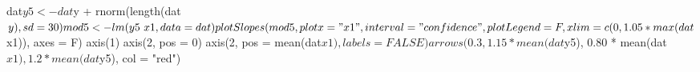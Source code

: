 \begin{Schunk}
\begin{Sinput}
 dat$y5 <- dat$y + rnorm(length(dat$y), sd = 30)
 mod5 <- lm(y5 ~ x1, data = dat)
 plotSlopes(mod5, plotx = "x1", interval = "confidence", plotLegend = F, xlim = c(0, 1.05 * max(dat$x1)), axes = F)
 axis(1)
 axis(2, pos = 0)
 axis(2, pos = mean(dat$x1), labels = FALSE)
 arrows(0.3, 1.15*mean(dat$y5), 0.80 * mean(dat$x1), 1.2*mean(dat$y5), col = "red")
\end{Sinput}
\end{Schunk}
